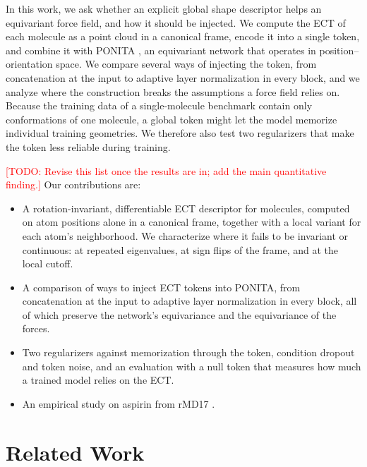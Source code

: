 \documentclass{article}
\newcommand{\todo}[1]{\textcolor{red}{[TODO: #1]}}
\begin{document}
In this work, we ask whether an explicit global shape descriptor helps an equivariant force field, and how it should be injected. We compute the ECT of each molecule as a point cloud in a canonical frame, encode it into a single token, and combine it with PONITA \citep{bekkers2024ponita}, an equivariant network that operates in position--orientation space. We compare several ways of injecting the token, from concatenation at the input to adaptive layer normalization in every block, and we analyze where the construction breaks the assumptions a force field relies on. Because the training data of a single-molecule benchmark contain only conformations of one molecule, a global token might let the model memorize individual training geometries. We therefore also test two regularizers that make the token less reliable during training.

\todo{Revise this list once the results are in; add the main quantitative finding.} Our contributions are:
\begin{itemize}
  \item A rotation-invariant, differentiable ECT descriptor for molecules, computed on atom positions alone in a canonical frame, together with a local variant for each atom's neighborhood. We characterize where it fails to be invariant or continuous: at repeated eigenvalues, at sign flips of the frame, and at the local cutoff.
  \item A comparison of ways to inject ECT tokens into PONITA, from concatenation at the input to adaptive layer normalization in every block, all of which preserve the network's equivariance and the equivariance of the forces.
  \item Two regularizers against memorization through the token, condition dropout and token noise, and an evaluation with a null token that measures how much a trained model relies on the ECT.
  \item An empirical study on aspirin from rMD17 \citep{christensen2020rmd17}.
\end{itemize}

\section{Related Work}
\label{sec:related}
\end{document}
